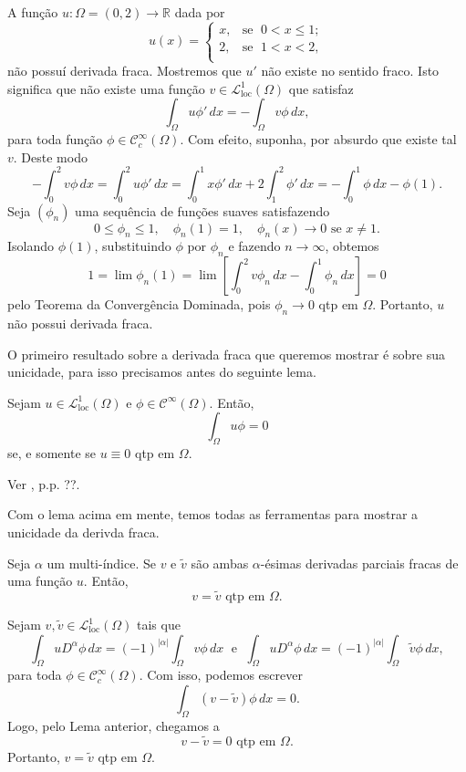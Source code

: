 \documentclass[a4paper, 11pt]{book}
\theoremstyle{definition}
\newcommand{\bR}{\mathbb{R}}
\newcommand{\cC}{\mathcal{C}}
\newcommand{\cL}{\mathcal{L}}
\newcommand{\loc}{\mathrm{loc}}
\begin{document}
\begin{ex}
    A função $u : \Omega  = (0,2) \to \bR$ dada por
    \[
        u(x) = \left\{
            \begin{array}{rl}
                x, & \!\text{se }\; 0 < x \leqslant 1;\\
                2, & \!\text{se }\; 1 < x < 2,\\
            \end{array}
        \right.
    \]
    não possuí derivada fraca.
    Mostremos que $u'$ não existe no sentido fraco.
    Isto significa que não existe uma função $v \in \cL^1_\loc(\Omega)$ que satisfaz
    \[
        \int_\Omega u \phi' \, dx = -\int_\Omega v \phi \,dx,
    \]
    para toda função $\phi \in \cC_c^\infty(\Omega)$. 
    Com efeito, suponha, por absurdo que existe tal $v$. Deste modo
    \[
        -\int_0^2 v \phi \, dx = \int_0^2 u \phi' \,dx = \int_0^1 x \phi' \,dx + 2\int_1^2 \phi' \,dx =- \int_0^1 \phi \,dx - \phi(1).
    \]
    Seja $(\phi_n)$ uma sequência de funções suaves satisfazendo
    \[
        0 \leqslant \phi_n \leqslant 1, \quad \phi_n(1) = 1, \quad \phi_n(x) \to 0 \text{ se } x \neq 1.
    \]
    Isolando $\phi(1)$, substituindo $\phi$ por $\phi_n$ e fazendo $n \to \infty$, obtemos
    \[
        1 = \lim \phi_n(1) = \lim \left[ \int_0^2 v \phi_n \, dx- \int_0^1 \phi_n \,dx \right] = 0
    \]
    pelo Teorema da Convergência Dominada, pois $\phi_n \to 0$ qtp em $\Omega$.
    Portanto, $u$ não possui derivada fraca.
\end{ex}

O primeiro resultado sobre a derivada fraca que queremos mostrar é sobre sua unicidade, para isso precisamos antes do seguinte lema.

\begin{lbox}
    Sejam $u \in \cL^1_{\loc}(\Omega)$ e $\phi \in \cC^\infty(\Omega)$.
    Então,
    \[
        \int_\Omega u \phi = 0
    \]
    se, e somente se $u \equiv 0$ qtp em $\Omega$.
\end{lbox}
\begin{prf}
    Ver \cite{brezis-functional.analysis}, p.p. ??.
\end{prf}

Com o lema acima em mente, temos todas as ferramentas para mostrar a unicidade da derivda fraca.

\begin{pbox}
    Seja $\alpha$ um multi-índice. Se $v$ e $\tilde v$ são ambas $\alpha$-ésimas derivadas parciais fracas de uma função $u$.
    Então,
    \[
        v = \tilde v \text{ qtp em } \Omega.
    \]
\end{pbox}
\begin{prf}
    Sejam $v, \tilde v \in \cL^1_{\mathrm{loc}}(\Omega)$ tais que
    \[
        \int_\Omega u D^\alpha \phi \,dx = (-1)^{|\alpha|} \int_\Omega v \phi \,dx \;\text{ e }\; \int_\Omega u D^\alpha \phi \, dx= (-1)^{|\alpha|}\int_\Omega \tilde v \phi \,dx,
    \]
    para toda $\phi \in \cC^\infty_c(\Omega)$. Com isso, podemos escrever
    \[
        \int_\Omega (v - \tilde v) \phi \, dx = 0.
    \]
    Logo, pelo Lema anterior, chegamos a
    \[
        v - \tilde v = 0 \text{ qtp em } \Omega.
    \]
    Portanto, $v = \tilde v$ qtp em $\Omega$.
\end{prf}
\end{document}
